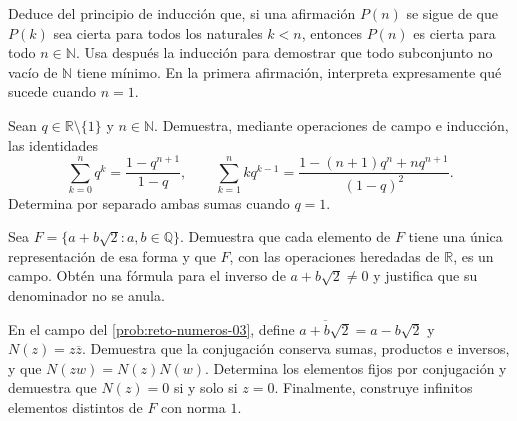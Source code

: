 \begin{samepage}
\begin{problem}\label{prob:reto-numeros-01}
Deduce del principio de inducción que, si una afirmación $P(n)$ se sigue de que $P(k)$ sea cierta para todos los naturales $k<n$, entonces $P(n)$ es cierta para todo $n\in\mathbb N$. Usa después la inducción para demostrar que todo subconjunto no vacío de $\mathbb N$ tiene mínimo. En la primera afirmación, interpreta expresamente qué sucede cuando $n=1$.~\cite{mseInduccion}
\end{problem}
\end{samepage}
\par{}

\begin{samepage}
\begin{problem}\label{prob:reto-numeros-02}
Sean $q\in\mathbb R\setminus\{1\}$ y $n\in\mathbb N$. Demuestra, mediante operaciones de campo e inducción, las identidades
\[
\sum_{k=0}^{n}q^k=\frac{1-q^{n+1}}{1-q},\qquad
\sum_{k=1}^{n}kq^{k-1}
=\frac{1-(n+1)q^n+nq^{n+1}}{(1-q)^2}.
\]
Determina por separado ambas sumas cuando $q=1$.~\cite{mseGeometrica}
\end{problem}
\end{samepage}
\par{}

\begin{samepage}
\begin{problem}\label{prob:reto-numeros-03}
Sea $F=\{a+b\sqrt2:a,b\in\mathbb Q\}$. Demuestra que cada elemento de $F$ tiene una única representación de esa forma y que $F$, con las operaciones heredadas de $\mathbb R$, es un campo. Obtén una fórmula para el inverso de $a+b\sqrt2\ne0$ y justifica que su denominador no se anula.~\cite{mseCampoRaiz}
\end{problem}
\end{samepage}
\par{}

\begin{samepage}
\begin{problem}\label{prob:reto-numeros-04}
En el campo del \cref{prob:reto-numeros-03}, define $\overline{a+b\sqrt2}=a-b\sqrt2$ y $N(z)=z\overline z$. Demuestra que la conjugación conserva sumas, productos e inversos, y que $N(zw)=N(z)N(w)$. Determina los elementos fijos por conjugación y demuestra que $N(z)=0$ si y solo si $z=0$. Finalmente, construye infinitos elementos distintos de $F$ con norma $1$.
\end{problem}
\end{samepage}
\par{}

